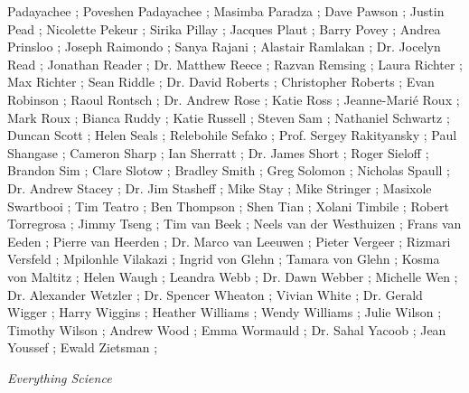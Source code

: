 Padayachee ; Poveshen Padayachee ; Masimba Paradza ; Dave Pawson ; Justin Pead ; Nicolette Pekeur ; Sirika Pillay ; Jacques Plaut ; Barry Povey ; Andrea Prinsloo ; Joseph Raimondo ; Sanya Rajani ; Alastair Ramlakan ; Dr. Jocelyn Read ; Jonathan Reader ; Dr. Matthew Reece ; Razvan Remsing ; Laura Richter ; Max Richter ; Sean Riddle ; Dr. David Roberts ; Christopher Roberts ; Evan Robinson ; Raoul Rontsch ; Dr. Andrew Rose ; Katie Ross ; Jeanne-Marié Roux ; Mark Roux ; Bianca Ruddy ; Katie Russell ; Steven Sam ; Nathaniel Schwartz ; Duncan Scott ; Helen Seals ; Relebohile Sefako ; Prof. Sergey Rakityansky ; Paul Shangase ; Cameron Sharp ; Ian Sherratt ; Dr. James Short ; Roger Sieloff ; Brandon Sim ; Clare Slotow ; Bradley Smith ; Greg Solomon ; Nicholas Spaull ; Dr. Andrew Stacey ; Dr. Jim Stasheff ; Mike Stay ; Mike Stringer ; Masixole Swartbooi ; Tim Teatro ; Ben Thompson ; Shen Tian ; Xolani Timbile ; Robert Torregrosa ; Jimmy Tseng ; Tim van Beek ; Neels van der Westhuizen ; Frans van Eeden ; Pierre van Heerden ; Dr. Marco van Leeuwen ; Pieter Vergeer ; Rizmari Versfeld ; Mpilonhle Vilakazi ; Ingrid von Glehn ; Tamara von Glehn ; Kosma von Maltitz ; Helen Waugh ; Leandra Webb ; Dr. Dawn Webber ; Michelle Wen ; Dr. Alexander Wetzler ; Dr. Spencer Wheaton ; Vivian White ; Dr. Gerald Wigger ; Harry Wiggins ; Heather Williams ; Wendy Williams ; Julie Wilson ; Timothy Wilson ; Andrew Wood ; Emma Wormauld ; Dr. Sahal Yacoob ; Jean Youssef ; Ewald Zietsman ;




\newpage
\thispagestyle{empty}

{\normalfont\sffamily\fontsize{22}\normalfont\itshape Everything Science} \par

